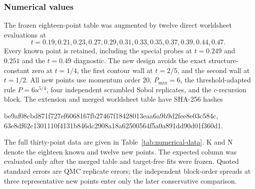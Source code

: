 \documentclass[11pt]{article}
\begin{document}
\subsubsection{Numerical values}

The frozen eighteen-point table was augmented by twelve direct worldsheet
evaluations at
\begin{equation}
 t=0.19,0.21,0.23,0.27,0.29,0.31,0.33,0.35,0.37,0.39,0.44,0.47.
\end{equation}
Every known point is retained, including the special probes at $t=0.249$ and
$0.251$ and the $t=0.49$ diagnostic.  The new design avoids the exact
structure-constant zero at $t=1/4$, the first contour wall at $t=2/5$, and
the second wall at $t=1/2$.  All new points use momentum order 20,
$P_{\max}=6$, the threshold-adapted rule $P=6u^{5/4}$, four independent
scrambled Sobol replicates, and the $c$-recursion block.  The extension and
merged worldsheet table have SHA-256 hashes
\begin{center}
\small\ttfamily
be9af08cbd871f727ef6068167fb27467f18428013eaa6a9b9d2fee8e03c584c,
\\
63e8df62c1301110f4131b846dc2908a18a62500564f5a0a891dd90d01f360d1.
\end{center}

The full thirty-point data are given in Table~\ref{tab:numerical-data}.
K and N denote the eighteen known and twelve new points.  The expected
column was evaluated only after the merged table and target-free fits were
frozen.  Quoted standard errors are QMC replicate errors; the independent
block-order spreads at three representative new points enter only the later
conservative comparison.
\end{document}
